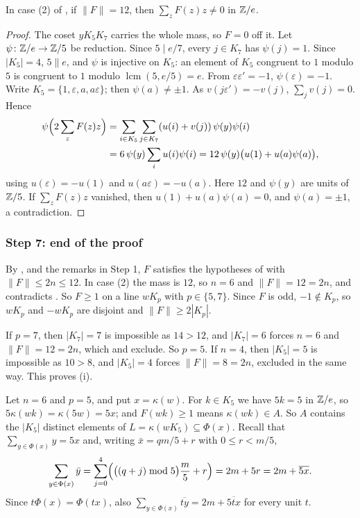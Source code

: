 \begin{lemma}\label{lem:killhalf}
In case \textup{(2)} of , if $\|F\|=12$, then
$\sum_{z}F(z)z\ne0$ in $\mathbb{Z}/e$.
\end{lemma}

\begin{proof}
The coset $yK_{5}K_{7}$ carries the whole mass, so $F=0$ off it. Let
$\psi\colon\mathbb{Z}/e\to\mathbb{Z}/5$ be reduction. Since $5\mid e/7$, every $j\in
K_{7}$ has $\psi(j)=1$. Since $|K_{5}|=4$, $5\parallel e$, and $\psi$ is
injective on $K_{5}$: an element of $K_{5}$ congruent to $1$ modulo $5$ is
congruent to $1$ modulo $\operatorname{lcm}(5,e/5)=e$. From $\varepsilon\varepsilon'=-1$,
$\psi(\varepsilon)=-1$. Write $K_{5}=\{1,\varepsilon,a,a\varepsilon\}$; then
$\psi(a)\ne\pm1$. As $v(j\varepsilon')=-v(j)$, $\sum_{j}v(j)=0$. Hence
\begin{align*}
  \psi\Bigl(2\sum_{z}F(z)z\Bigr)&=\sum_{i\in K_{5}}\sum_{j\in K_{7}}
  (u(i)+v(j))\,\psi(y)\psi(i)\\
  &=6\,\psi(y)\sum_{i}u(i)\psi(i)=12\,\psi(y)\bigl(u(1)+u(a)\psi(a)\bigr),
\end{align*}
using $u(\varepsilon)=-u(1)$ and $u(a\varepsilon)=-u(a)$. Here $12$ and $\psi(y)$ are
units of $\mathbb{Z}/5$. If $\sum_{z}F(z)z$ vanished, then $u(1)+u(a)\psi(a)=0$, and
$\psi(a)=\pm1$, a contradiction.
\end{proof}

\subsubsection*{Step 7: end of the proof}
By ,  and the remarks in Step 1, $F$
satisfies the hypotheses of  with $\|F\|\le2n\le12$. In case
(2) the mass is $12$, so $n=6$ and $\|F\|=12=2n$, and 
contradicts . So $F\ge1$ on a line $wK_{p}$ with
$p\in\{5,7\}$. Since $F$ is odd, $-1\notin K_{p}$, so $wK_{p}$ and
$-wK_{p}$ are disjoint and $\|F\|\ge2|K_{p}|$.

If $p=7$, then $|K_{7}|=7$ is impossible as $14>12$, and $|K_{7}|=6$ forces
$n=6$ and $\|F\|=12=2n$, which  and 
exclude. So $p=5$. If $n=4$, then $|K_{5}|=5$ is impossible as $10>8$, and
$|K_{5}|=4$ forces $\|F\|=8=2n$, excluded in the same way. This proves (i).

Let $n=6$ and $p=5$, and put $x=\kappa(w)$. For $k\in K_{5}$ we have
$5k=5$ in $\mathbb{Z}/e$, so $5\kappa(wk)=\kappa(5w)=5x$; and $F(wk)\ge1$ means
$\kappa(wk)\in A$. So $A$ contains the $|K_{5}|$ distinct elements of
$L=\kappa(wK_{5})\subseteq\Phi(x)$. Recall that $\sum_{y\in\Phi(x)}y=5x$ and,
writing $\bar x=qm/5+r$ with $0\le r<m/5$,
\[
  \sum_{y\in\Phi(x)}\bar y=\sum_{j=0}^{4}\Bigl(\bigl((q+j)\bmod5\bigr)
  \frac{m}{5}+r\Bigr)=2m+5r=2m+\overline{5x}.
\]
Since $t\Phi(x)=\Phi(tx)$, also $\sum_{y\in\Phi(x)}\overline{ty}=2m+
\overline{5tx}$ for every unit $t$.


